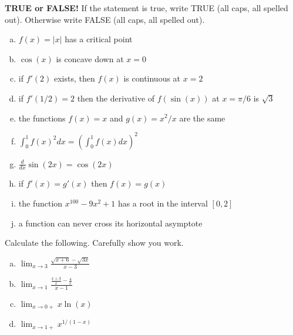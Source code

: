\documentclass[11pt]{exam}
\theoremstyle{definition}
\begin{document}
\begin{questions}

\addpoints

\question[20]\mbox{}
\textbf{TRUE or FALSE!}
If the statement is true, write TRUE (all caps, all spelled out).
Otherwise write FALSE (all caps, all spelled out).
\begin{enumerate}[(a)]
\item $f(x) = |x|$ has a critical point
\vspace{0.6in}
\item $\cos(x)$ is concave down at $x=0$
\vspace{0.6in}
\item if $f'(2)$ exists, then $f(x)$ is continuous at $x=2$
\vspace{0.6in}
\item if $f'(1/2) = 2$ then the derivative of $f(\sin(x))$ at $x=\pi/6$ is  $\sqrt{3}$
\vspace{0.6in}
\item the functions $f(x) = x$ and $g(x) = x^2/x$ are the same
\vspace{0.6in}
\item $\int_0^1 f(x)^2dx = \left(\int_0^1 f(x) dx\right)^2$
\vspace{0.6in}
\item $\frac{d}{dx}\sin(2x) = \cos(2x)$
\vspace{0.6in}
\item if $f'(x) = g'(x)$ then $f(x) = g(x)$
\vspace{0.6in}
\item the function $x^{100}-9x^2 + 1$ has a root in the interval $[0,2]$
\vspace{0.6in}
\item a function can never cross its horizontal asymptote
\end{enumerate}

\newpage
\question[10]\mbox{}
Calculate the following.  Carefully show you work.
\begin{enumerate}[(a)]
\item $\lim_{x\rightarrow 3}\frac{\sqrt{x+6}-\sqrt{3x}}{x-3}$
\vspace{2in}
\item $\lim_{x\rightarrow 1}\frac{\frac{x+3}{x}-\frac{4}{x}}{x-1}$
\vspace{2in}
\item $\lim_{x\rightarrow 0+} x\ln(x)$
\vspace{2in}
\item $\lim_{x\rightarrow 1+} x^{1/(1-x)}$
\vspace{2in}
\end{enumerate}


\end{questions}
\end{document}
